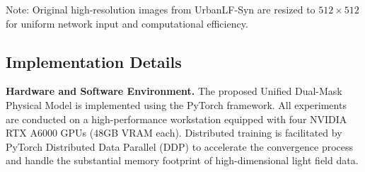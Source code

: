 \documentclass[lettersize,journal]{IEEEtran}
\begin{document}
\begin{table}[!t]
\caption{Summary of Datasets Used for Training and Evaluation}\label{tab:datasets}
\centering\small
{}
\vspace{1ex}
\parbox{\textwidth}{\footnotesize *Note: Original high-resolution images from UrbanLF-Syn are resized to $512 \times 512$ for uniform network input and computational efficiency.}
\end{table}

\subsection{Implementation Details}

\textbf{Hardware and Software Environment.} 
The proposed Unified Dual-Mask Physical Model is implemented using the PyTorch framework. All experiments are conducted on a high-performance workstation equipped with four NVIDIA RTX A6000 GPUs (48GB VRAM each). Distributed training is facilitated by PyTorch Distributed Data Parallel (DDP) to accelerate the convergence process and handle the substantial memory footprint of high-dimensional light field data.
\end{document}
